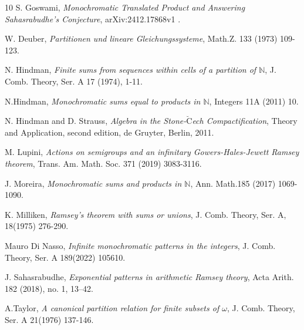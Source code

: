 \documentclass[12pt]{amsart}
\theoremstyle{plain}
\theoremstyle{definition}
\theoremstyle{remark}
\numberwithin{equation}{section}
\newcommand{\bN}{\mathbb{N}}
\begin{document}
\begin{thebibliography}{10}
 S. Goswami, \textit{Monochromatic Translated Product and Answering Sahasrabudhe’s Conjecture}, arXiv:2412.17868v1 .

\vspace{.3cm}
 W. Deuber, \textit{Partitionen und lineare Gleichungssysteme}, Math.Z. 133 (1973) 109-123.

\vspace{.3cm}
 N. Hindman,
\textit{Finite sums from sequences within cells of a partition of $\mathbb{N}$}, J. Comb. Theory, Ser. A 17 (1974), 1-11.

\vspace{.3cm}

 N.Hindman, \textit{Monochromatic sums equal to products in $\bN$}, Integers 11A (2011) 10.

\vspace{.3cm}

 N. Hindman and D. Strauss, \textit{ Algebra in the Stone-$\breve{\mbox{C}}$ech Compactification}, Theory and
    Application, second edition, de Gruyter, Berlin, 2011.

\vspace{.3cm}    

 M. Lupini, \textit{Actions on semigroups and an infinitary Gowers-Hales-Jewett Ramsey theorem}, Trans. Am. Math. Soc. 371 (2019) 3083-3116.

\vspace{.3cm}
 J. Moreira, \textit{Monochromatic sums and products in $\bN$}, Ann. Math.185 (2017) 1069-1090.      

\vspace{.3cm}
 K. Milliken, \textit{Ramsey's theorem with sums or unions}, J. Comb. Theory, Ser. A, 18(1975) 276-290.

\vspace{.3cm}
 Mauro Di Nasso, \textit{Infinite monochromatic patterns in the integers},  J. Comb. Theory, Ser. A 189(2022) 105610. 

\vspace{.3cm}
 J. Sahasrabudhe,
\textit{Exponential patterns in arithmetic Ramsey theory},
Acta Arith. 182 (2018), no. 1, 13–42.

\vspace{.3cm}

 A.Taylor, \textit{A canonical partition relation for finite subsets of $\omega$}, J. Comb. Theory, Ser. A 21(1976) 137-146.



\end{thebibliography}
\end{document}
